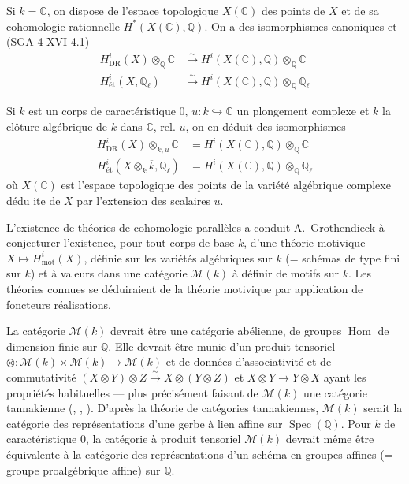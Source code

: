\documentclass[12pt,a4paper]{article}
\theoremstyle{plain}
\theoremstyle{definition}
\theoremstyle{remark}
\DeclareMathOperator{\Spec}{Spec}
\DeclareMathOperator{\Hom}{Hom}
\newcommand{\mot}{\mathrm{mot}}
\providecommand{\Hom}{\operatorname{Hom}}
\providecommand{\Spec}{\operatorname{Spec}}
\providecommand{\mot}{\mathrm{mot}}
\providecommand{\DR}{\mathrm{DR}}
\begin{document}
Si $k = \mathbb{C}$, on dispose de l'espace topologique $X(\mathbb{C})$ des points de $X$
et de sa cohomologie rationnelle $H^*(X(\mathbb{C}), \mathbb{Q})$. On a des isomorphismes
canoniques \cite{G} et (SGA 4 XVI 4.1)
\begin{align}
H^i_{\DR}(X) \otimes_{\mathbb{Q}} \mathbb{C} &\xrightarrow{\sim} H^i(X(\mathbb{C}), \mathbb{Q}) \otimes_{\mathbb{Q}} \mathbb{C} \label{eq:1.1.1} \\
H^i_\text{\'et}(X, \mathbb{Q}_\ell) &\xrightarrow{\sim} H^i(X(\mathbb{C}), \mathbb{Q}) \otimes_{\mathbb{Q}} \mathbb{Q}_\ell \label{eq:1.1.2}
\end{align}

Si $k$ est un corps de caract\'eristique $0$, $u: k \hookrightarrow \mathbb{C}$ un plongement
complexe et $\overline{k}$ la cl\^oture alg\'ebrique de $k$ dans $\mathbb{C}$, rel. $u$, on en
d\'eduit des isomorphismes
\begin{align}
H^i_{\DR}(X) \otimes_{k,u} \mathbb{C} &= H^i(X(\mathbb{C}), \mathbb{Q}) \otimes_{\mathbb{Q}} \mathbb{C} \label{eq:1.1.3} \\
H^i_\text{\'et}(X \otimes_k \overline{k}, \mathbb{Q}_\ell) &= H^i(X(\mathbb{C}), \mathbb{Q}) \otimes_{\mathbb{Q}} \mathbb{Q}_\ell \label{eq:1.1.4}
\end{align}
o\`u $X(\mathbb{C})$ est l'espace topologique des points de la vari\'et\'e alg\'ebrique
complexe d\'edu ite de $X$ par l'extension des scalaires $u$.

L'existence de th\'eories de cohomologie parall\`eles a conduit A.~Grothendieck \`a
conjecturer l'existence, pour tout corps de base $k$, d'une th\'eorie motivique
$X \mapsto H^i_\mot(X)$, d\'efinie sur les vari\'et\'es alg\'ebriques sur $k$ (= sch\'emas
de type fini sur $k$) et \`a valeurs dans une cat\'egorie $\mathcal{M}(k)$ \`a d\'efinir de
motifs sur $k$. Les th\'eories connues se d\'eduiraient de la th\'eorie motivique par
application de foncteurs r\'ealisations.

La cat\'egorie $\mathcal{M}(k)$ devrait \^etre une cat\'egorie ab\'elienne, de groupes $\Hom$
de dimension finie sur $\mathbb{Q}$. Elle devrait \^etre munie d'un produit tensoriel
$\otimes: \mathcal{M}(k) \times \mathcal{M}(k) \to \mathcal{M}(k)$ et de donn\'ees
d'associativit\'e et de commutativit\'e $(X \otimes Y) \otimes Z \xrightarrow{\sim}
X \otimes (Y \otimes Z)$ et $X \otimes Y \to Y \otimes X$ ayant les propri\'et\'es
habituelles --- plus pr\'ecis\'ement faisant de $\mathcal{M}(k)$ une cat\'egorie tannakienne
(\cite{S}, \cite{DM}, \cite{D4}). D'apr\`es la th\'eorie de cat\'egories tannakiennes,
$\mathcal{M}(k)$ serait la cat\'egorie des repr\'esentations d'une gerbe \`a lien affine sur
$\Spec(\mathbb{Q})$. Pour $k$ de caract\'eristique $0$, la cat\'egorie \`a produit tensoriel
$\mathcal{M}(k)$ devrait m\^eme \^etre \'equivalente \`a la cat\'egorie des repr\'esentations
d'un sch\'ema en groupes affines (= groupe proalg\'ebrique affine) sur $\mathbb{Q}$.
\end{document}
